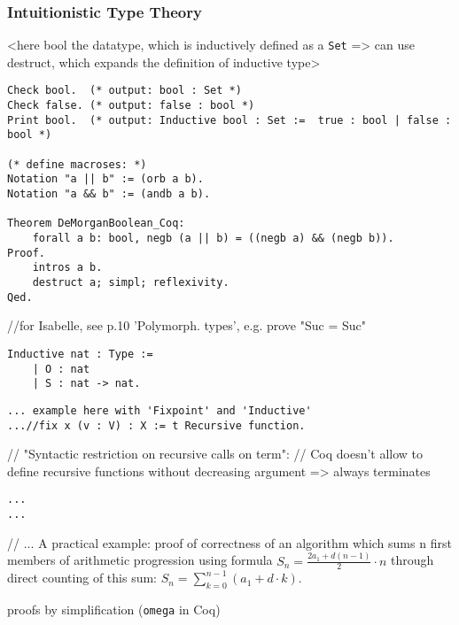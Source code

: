 \documentclass[article]{aaltoseries}
\begin{document}
\subsubsection{Intuitionistic Type Theory}

<here bool the datatype, which is inductively defined as a \texttt{Set} => can use destruct, which expands the definition of inductive type>
\begin{lstlisting}[language=coq,caption={Propositional logic proof: de Morgan's law for booleans},label={Coq:DeMorgan_bool}]
Check bool.  (* output: bool : Set *)
Check false. (* output: false : bool *)
Print bool.  (* output: Inductive bool : Set :=  true : bool | false : bool *)

(* define macroses: *)
Notation "a || b" := (orb a b).
Notation "a && b" := (andb a b).

Theorem DeMorganBoolean_Coq:
    forall a b: bool, negb (a || b) = ((negb a) && (negb b)).
Proof.
    intros a b.
    destruct a; simpl; reflexivity.
Qed.
\end{lstlisting}
//for Isabelle, see p.10 'Polymorph. types', e.g. prove "Suc = Suc" %




\begin{lstlisting}[language=coq]
Inductive nat : Type :=
	| O : nat
	| S : nat -> nat.
\end{lstlisting}

\begin{lstlisting}[caption={Recursive function definition: factorial}]
... example here with 'Fixpoint' and 'Inductive'
...//fix x (v : V) : X := t Recursive function.
\end{lstlisting}
// "Syntactic restriction on recursive calls on term":
// Coq doesn't allow to define recursive functions without decreasing argument => always terminates

\begin{lstlisting}[caption={Inductive data type definition: ???}]
...
...
\end{lstlisting}


// ... A practical example: proof of correctness of an algorithm which sums n first members of arithmetic progression using formula $S_{n} = { {\frac {2 a_{1} + d (n - 1)}{2} \cdot n}}$ through direct counting of this sum: $S_{n} = \sum\limits_{k=0}^{n-1} (a_{1} + d \cdot k)$.

proofs by simplification (\texttt{omega} in Coq)
 
\end{document}
